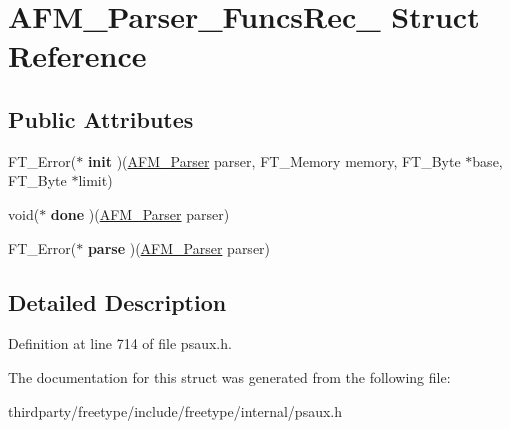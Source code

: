 \hypertarget{struct_a_f_m___parser___funcs_rec__}{}\section{A\+F\+M\+\_\+\+Parser\+\_\+\+Funcs\+Rec\+\_\+ Struct Reference}
\label{struct_a_f_m___parser___funcs_rec__}
\subsection*{Public Attributes}
\begin{DoxyCompactItemize}
\item 
\mbox{\label{struct_a_f_m___parser___funcs_rec___ab96ca52171618217bc852d01dbdaf4ad}} 
F\+T\+\_\+\+Error($\ast$ {\bfseries init} )(\hyperlink{struct_a_f_m___parser_rec__}{A\+F\+M\+\_\+\+Parser} parser, F\+T\+\_\+\+Memory memory, F\+T\+\_\+\+Byte $\ast$base, F\+T\+\_\+\+Byte $\ast$limit)
\item 
\mbox{\label{struct_a_f_m___parser___funcs_rec___ae084d9f1b6768f93629073c9d1c98aee}} 
void($\ast$ {\bfseries done} )(\hyperlink{struct_a_f_m___parser_rec__}{A\+F\+M\+\_\+\+Parser} parser)
\item 
\mbox{\label{struct_a_f_m___parser___funcs_rec___ad8f41aafada1b5a84f5e1ac46f545669}} 
F\+T\+\_\+\+Error($\ast$ {\bfseries parse} )(\hyperlink{struct_a_f_m___parser_rec__}{A\+F\+M\+\_\+\+Parser} parser)
\end{DoxyCompactItemize}


\subsection{Detailed Description}


Definition at line 714 of file psaux.\+h.



The documentation for this struct was generated from the following file\+:\begin{DoxyCompactItemize}
\item 
thirdparty/freetype/include/freetype/internal/psaux.\+h\end{DoxyCompactItemize}
